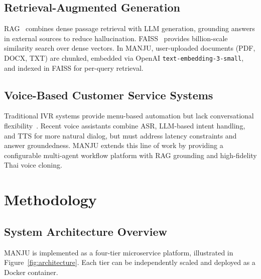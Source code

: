 \documentclass[10pt, a4paper, twocolumn]{article}
\begin{document}
\subsection{Retrieval-Augmented Generation}
RAG~\cite{lewis2020rag} combines dense passage retrieval with LLM generation, grounding answers in external sources to reduce hallucination.
FAISS~\cite{johnson2019faiss} provides billion-scale similarity search over dense vectors.
In MANJU, user-uploaded documents (PDF, DOCX, TXT) are chunked, embedded via OpenAI \texttt{text-embedding-3-small}, and indexed in FAISS for per-query retrieval.

\subsection{Voice-Based Customer Service Systems}
Traditional IVR systems provide menu-based automation but lack conversational flexibility~\cite{gans2003callcenters}.
Recent voice assistants combine ASR, LLM-based intent handling, and TTS for more natural dialog, but must address latency constraints and answer groundedness.
MANJU extends this line of work by providing a configurable multi-agent workflow platform with RAG grounding and high-fidelity Thai voice cloning.

\section{Methodology}
\label{sec:methodology}

\subsection{System Architecture Overview}

MANJU is implemented as a four-tier microservice platform, illustrated in Figure~\ref{fig:architecture}.
Each tier can be independently scaled and deployed as a Docker container.
\end{document}
